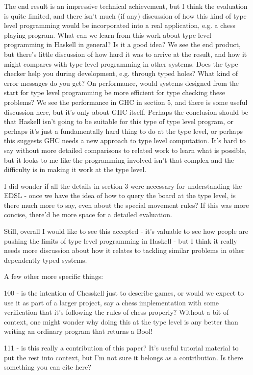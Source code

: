 The end result is an impressive technical achievement, but I think the evaluation is quite limited, and there isn't much (if any) discussion of how this kind of type level programming would be incorporated into a real application, e.g. a chess playing program. What can we learn from this work about type level programming in Haskell in general? Is it a good idea? We see the end product, but there's little discussion of how hard it was to arrive at the result, and how it might compares with type level programming in other systems. Does the type checker help you during development, e.g. through typed holes? What kind of error messages do you get? On performance, would systems designed from the start for type level programming be more efficient for type checking these problems? We see the performance in GHC in section 5, and there is some useful discussion here, but it's only about GHC itself. Perhaps the conclusion should be that Haskell isn't going to be suitable for this type of type level program, or perhaps it's just a fundamentally hard thing to do at the type level, or perhaps this suggests GHC needs a new approach to type level computation. It's hard to say without more detailed comparisons to related work to learn what is possible, but it looks to me like the programming involved isn't that complex and the difficulty is in making it work at the type level.

I did wonder if all the details in section 3 were necessary for understanding the EDSL - once we have the idea of how to query the board at the type level, is there much more to say, even about the special movement rules? If this was more concise, there'd be more space for a detailed evaluation.

Still, overall I would like to see this accepted - it's valuable to see how people are pushing the limits of type level programming in Haskell - but I think it really needs more discussion about how it relates to tackling similar problems in other dependently typed systems.

A few other more specific things:

100 - is the intention of Chesskell just to describe games, or would we expect to use it as part of a larger project, say a chess implementation with some verification that it's following the rules of chess properly? Without a bit of context, one might wonder why doing this at the type level is any better than writing an ordinary program that returns a Bool!

111 - is this really a contribution of this paper? It's useful tutorial material to put the rest into context, but I'm not sure it belongs as a contribution. Is there something you can cite here?

